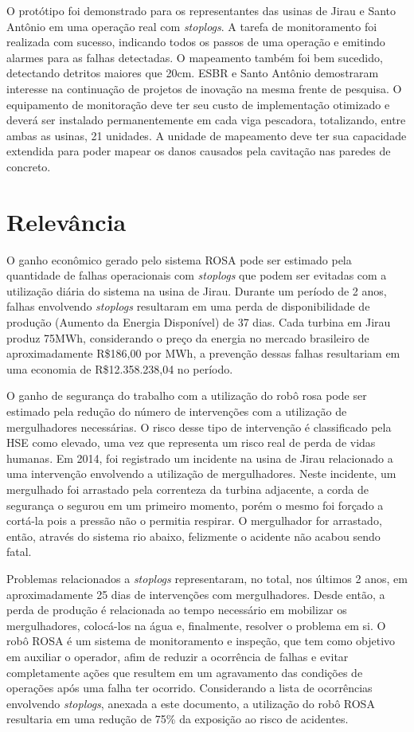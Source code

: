 O protótipo foi demonstrado para os representantes das usinas de Jirau e Santo
Antônio em uma operação real com \textit{stoplogs}. A tarefa de monitoramento
foi realizada com sucesso, indicando todos os passos de uma operação e emitindo
alarmes para as falhas detectadas. O mapeamento também foi bem sucedido,
detectando detritos maiores que 20cm. ESBR e Santo Antônio demostraram interesse
na continuação de projetos de inovação na mesma frente de pesquisa. O
equipamento de monitoração deve ter seu custo de implementação otimizado e
deverá ser instalado permanentemente em cada viga pescadora, totalizando, entre
ambas as usinas, 21 unidades. A unidade de mapeamento deve ter sua capacidade
extendida para poder mapear os danos causados pela cavitação nas paredes de
concreto.
 
\section*{Relevância}
O ganho econômico gerado pelo sistema ROSA pode ser estimado pela quantidade de
falhas operacionais com \textit{stoplogs} que podem ser evitadas com a
utilização diária do sistema na usina de Jirau. Durante um período de 2 anos,
falhas envolvendo \textit{stoplogs} resultaram em uma perda de disponibilidade
de produção (Aumento da Energia Disponível) de 37 dias. Cada turbina
em Jirau produz 75MWh, considerando o preço da energia no mercado brasileiro de
aproximadamente R\$186,00 por MWh, a prevenção dessas falhas resultariam em uma
economia de R\$12.358.238,04 no período.

O ganho de segurança do trabalho com a utilização do robô rosa pode ser estimado
pela redução do número de intervenções com a utilização de mergulhadores
necessárias. O risco desse tipo de intervenção é classificado pela HSE como
elevado, uma vez que representa um risco real de perda de vidas humanas. Em
2014, foi registrado um incidente na usina de Jirau relacionado a uma
intervenção envolvendo a utilização de mergulhadores. Neste incidente, um
mergulhado foi arrastado pela correnteza da turbina adjacente, a corda de
segurança o segurou em um primeiro momento, porém o mesmo foi forçado a cortá-la
pois a pressão não o permitia respirar. O mergulhador for arrastado, então,
através do sistema rio abaixo, felizmente o acidente não acabou sendo fatal.

Problemas relacionados a \textit{stoplogs} representaram, no total, nos últimos
2 anos, em aproximadamente 25 dias de intervenções com mergulhadores. Desde
então, a perda de produção é relacionada ao tempo necessário em mobilizar os
mergulhadores, colocá-los na água e, finalmente, resolver o problema em si. O
robô ROSA é um sistema de monitoramento e inspeção, que tem como objetivo
em auxiliar o operador, afim de reduzir a ocorrência de falhas e evitar
completamente ações que resultem em um agravamento das condições de operações
após uma falha ter ocorrido. Considerando a lista de ocorrências envolvendo
\textit{stoplogs}, anexada a este documento, a utilização do robô ROSA
resultaria em uma redução de 75\% da exposição ao risco de acidentes. 

